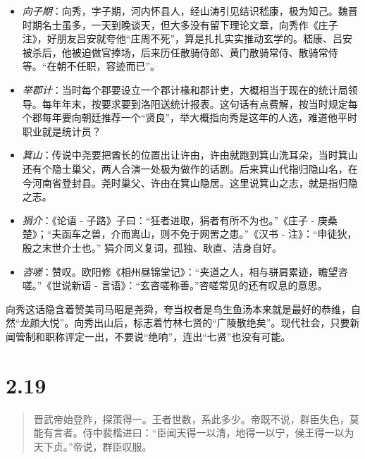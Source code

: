 \documentclass[]{book}
\providecommand{\tightlist}{%
  \setlength{\itemsep}{0pt}\setlength{\parskip}{0pt}}
\begin{document}
\begin{itemize}
\tightlist
\item
  \emph{向子期}：向秀，字子期，河内怀县人，经山涛引见结识嵇康，极为知己。魏晋时期名士虽多，一天到晚谈天，但大多没有留下理论文章，向秀作《庄子注》，好朋友吕安就夸他``庄周不死''，算是扎扎实实推动玄学的。嵇康、吕安被杀后，他被迫做官捧场，后来历任散骑侍郎、黄门散骑常侍、散骑常侍等。``在朝不任职，容迹而已''。
\item
  \emph{举郡计}：当时每个郡要设立一个郡计椽和郡计吏，大概相当于现在的统计局领导。每年年末，按要求要到洛阳送统计报表。这句话有点费解，按当时规定每个郡每年要向朝廷推荐一个``贤良''，举大概指向秀是这年的人选，难道他平时职业就是统计员？
\item
  \emph{箕山}：传说中尧要把酋长的位置出让许由，许由就跑到箕山洗耳朵，当时箕山还有个隐士巢父，两人合演一处极为做作的话剧。后来箕山代指归隐山名，在今河南省登封县。尧时巢父、许由在箕山隐居。这里说箕山之志，就是指归隐之志。
\item
  \emph{狷介}：《论语 - 子路》子曰：``狂者进取，狷者有所不为也。''《庄子
  - 庚桑楚》；``夫函车之兽，介而离山，则不免于网罟之患。''《汉书 -
  注》：``申徒狄，殷之末世介士也。''
  狷介同义复词，孤独、耿直、洁身自好。
\item
  \emph{咨嗟}：赞叹。欧阳修《相州昼锦堂记》：``夹道之人，相与骈肩累迹，瞻望咨嗟。''《世说新语
  - 言语》：``玄咨嗟称善。''咨嗟常见的还有叹息的意思。
\end{itemize}

向秀这话隐含着赞美司马昭是尧舜，夸当权者是鸟生鱼汤本来就是最好的恭维，自然``龙颜大悦''。向秀出山后，标志着竹林七贤的``广陵散绝矣''。现代社会，只要新闻管制和职称评定一出，不要说``绝响''，连出``七贤''也没有可能。

\section{2.19}\label{section-65}

\begin{quote}
晋武帝始登阼，探策得一。王者世数，系此多少。帝既不说，群臣失色，莫能有言者。侍中裴楷进曰：``臣闻天得一以清，地得一以宁，侯王得一以为天下贞。''帝说，群臣叹服。
\end{quote}
\end{document}
